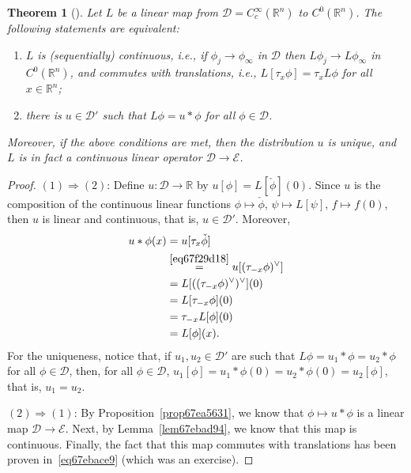 \documentclass[a4paper,9pt]{amsart}
\newcommand{\scr}[1]{\mathscr{#1}}
\newcommand{\R}{\mathbb{R}}	%
\newcommand{\THEN}{\Rightarrow}	%
\theoremstyle{plain}
\newtheorem{theorem}[proposition]{Theorem}
\theoremstyle{definition}
\theoremstyle{remark}
\begin{document}
\begin{theorem}[{\cite[Thm.4.2.1]{MR717035}}]\label{thm67ebada4}
	Let $L$ be a linear map from $\scr D = C^\infty_c(\R^n)$ to $C^0(\R^n)$.
	The following statements are equivalent:
	\begin{enumerate}
	\item $L$ is (sequentially) continuous, i.e., if $\phi_j\to\phi_\infty$ in $\scr D$ then $L\phi_j\to L\phi_\infty$ in $C^0(\R^n)$,
		and commutes with translations, i.e., $L[\tau_x \phi] = \tau_x L\phi$ for all $x\in\R^n$;
	\item
	there is $u\in \scr D'$ such that $L\phi = u*\phi$ for all $\phi\in\scr D$.
	\end{enumerate}
	Moreover, if the above conditions are met, then 
	the distribution $u$ is unique,
	and $L$ is in fact a continuous linear operator $\scr D\to\scr E$.
\end{theorem}
\begin{proof}
	$(1)\THEN(2)$:
	Define $u:\scr D\to\R$ by $u[\phi] = L[\check\phi](0)$.
	Since $u$ is the composition of the continuous linear functions $\phi\mapsto\check\phi$, $\psi\mapsto L[\psi]$, $f\mapsto f(0)$, 
	then $u$ is linear and continuous, that is, $u\in\scr D'$.
	Moreover,
	\begin{align*}
		u*\phi(x) 
		&= u[\tau_x\check\phi] \\
		&\overset{\eqref{eq67f29d18}}= u[(\tau_{-x}\phi)^\vee] \\
		&= L[((\tau_{-x}\phi)^\vee)^\vee](0) \\
		&= L[\tau_{-x}\phi](0) \\
		&= \tau_{-x}L[\phi](0) \\
		&= L[\phi](x) .
	\end{align*}
	For the uniqueness, notice that, if $u_1,u_2\in\scr D'$ are such that $L\phi=u_1*\phi=u_2*\phi$ for all $\phi\in\scr D$,
	then, for all $\phi\in\scr D$, $u_1[\phi] = u_1*\phi(0) = u_2*\phi(0) = u_2[\phi]$,
	that is, $u_1=u_2$.
	
	$(2)\THEN(1)$:
	By Proposition~\ref{prop67ea5631}, we know that $\phi\mapsto u*\phi$ is a linear map $\scr D\to\scr E$.
	Next, by Lemma~\ref{lem67ebad94}, we know that this map is continuous.
	Finally, the fact that this map commutes with translations has been proven in~\eqref{eq67ebace9} (which was an exercise).
\end{proof}
\end{document}
